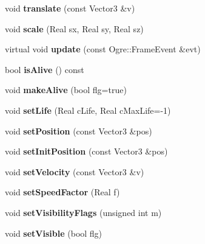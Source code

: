 \begin{DoxyCompactItemize}
\item 
\hypertarget{class_g_a_m_e___o_b_j_a2e6d96dcfc917dcfc7fd3bf07ab3e27d}{void {\bfseries translate} (const Vector3 \&v)}\label{class_g_a_m_e___o_b_j_a2e6d96dcfc917dcfc7fd3bf07ab3e27d}

\item 
\hypertarget{class_g_a_m_e___o_b_j_aa375564b6140c1f95b76a7748dac9a74}{void {\bfseries scale} (Real sx, Real sy, Real sz)}\label{class_g_a_m_e___o_b_j_aa375564b6140c1f95b76a7748dac9a74}

\item 
\hypertarget{class_g_a_m_e___o_b_j_a8b291edd1e484532e6930feae8154257}{virtual void {\bfseries update} (const Ogre\-::\-Frame\-Event \&evt)}\label{class_g_a_m_e___o_b_j_a8b291edd1e484532e6930feae8154257}

\item 
\hypertarget{class_g_a_m_e___o_b_j_a63f209ed6267da656c9a9cb268ad1a4e}{bool {\bfseries is\-Alive} () const }\label{class_g_a_m_e___o_b_j_a63f209ed6267da656c9a9cb268ad1a4e}

\item 
\hypertarget{class_g_a_m_e___o_b_j_a98182473ba8305da60c3f8a0fe8f2bdf}{void {\bfseries make\-Alive} (bool flg=true)}\label{class_g_a_m_e___o_b_j_a98182473ba8305da60c3f8a0fe8f2bdf}

\item 
\hypertarget{class_g_a_m_e___o_b_j_a0414bbb98f31b40e73454fd01e9eeae2}{void {\bfseries set\-Life} (Real c\-Life, Real c\-Max\-Life=-\/1)}\label{class_g_a_m_e___o_b_j_a0414bbb98f31b40e73454fd01e9eeae2}

\item 
\hypertarget{class_g_a_m_e___o_b_j_a6ec6b1f338b4d6c7117b3e8f9f05029e}{void {\bfseries set\-Position} (const Vector3 \&pos)}\label{class_g_a_m_e___o_b_j_a6ec6b1f338b4d6c7117b3e8f9f05029e}

\item 
\hypertarget{class_g_a_m_e___o_b_j_ac106b5c662073f8e96cc66d96ee20285}{void {\bfseries set\-Init\-Position} (const Vector3 \&pos)}\label{class_g_a_m_e___o_b_j_ac106b5c662073f8e96cc66d96ee20285}

\item 
\hypertarget{class_g_a_m_e___o_b_j_af1e5d350761d9769632fd2d6462f6d1b}{void {\bfseries set\-Velocity} (const Vector3 \&v)}\label{class_g_a_m_e___o_b_j_af1e5d350761d9769632fd2d6462f6d1b}

\item 
\hypertarget{class_g_a_m_e___o_b_j_aaf30a973f5361ff2ba4a0d99b3966aed}{void {\bfseries set\-Speed\-Factor} (Real f)}\label{class_g_a_m_e___o_b_j_aaf30a973f5361ff2ba4a0d99b3966aed}

\item 
\hypertarget{class_g_a_m_e___o_b_j_a7db01e4e1a9baff3efdc1d77cff5dd78}{void {\bfseries set\-Visibility\-Flags} (unsigned int m)}\label{class_g_a_m_e___o_b_j_a7db01e4e1a9baff3efdc1d77cff5dd78}

\item 
\hypertarget{class_g_a_m_e___o_b_j_aec2125e20b74494704dbb32047e25bfb}{void {\bfseries set\-Visible} (bool flg)}\label{class_g_a_m_e___o_b_j_aec2125e20b74494704dbb32047e25bfb}

\end{DoxyCompactItemize}
